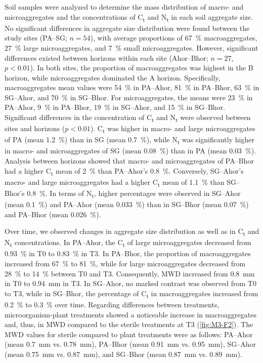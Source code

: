 Soil samples were analyzed to determine the mass distribution of macro- and microaggregates and the concentrations of C\textsubscript{t} and N\textsubscript{t} in each soil aggregate size. No significant differences in aggregate size distribution were found between the study sites (PA--SG; \(n = 54\)), with average proportions of \SI{67}{\percent} macroaggregates, \SI{27}{\percent} large microaggregates, and \SI{7}{\percent} small microaggregates. However, significant differences existed between horizons within each site (Ahor--Bhor; \(n = 27\), \(p < 0.01\)). In both sites, the proportion of macroaggregates was highest in the B horizon, while microaggregates dominated the A horizon. Specifically, macroaggregates mean values were \SI{54}{\percent} in PA--Ahor, \SI{81}{\percent} in PA--Bhor, \SI{63}{\percent} in SG--Ahor, and \SI{70}{\percent} in SG--Bhor. For microaggregates, the means were \SI{23}{\percent} in PA--Ahor, \SI{9}{\percent} in PA--Bhor, \SI{19}{\percent} in SG--Ahor, and \SI{15}{\percent} in SG--Bhor. Significant differences in the concentration of C\textsubscript{t} and N\textsubscript{t} were observed between sites and horizons (\(p < 0.01\)). C\textsubscript{t} was higher in macro- and large microaggregates of PA (mean \SI{1.2}{\percent}) than in SG (mean \SI{0.7}{\percent}), while N\textsubscript{t} was significantly higher in macro- and microaggregates of SG (mean \SI{0.08}{\percent}) than in PA (mean \SI{0.03}{\percent}). Analysis between horizons showed that macro- and microaggregates of PA--Bhor had a higher C\textsubscript{t} mean of \SI{2}{\percent} than PA--Ahor’s \SI{0.8}{\percent}. Conversely, SG--Ahor’s macro- and large microaggregates had a higher C\textsubscript{t} mean of \SI{1.1}{\percent} than SG--Bhor’s \SI{0.8}{\percent}. In terms of N\textsubscript{t}, higher percentages were observed in SG--Ahor (mean \SI{0.1}{\percent}) and PA--Ahor (mean \SI{0.033}{\percent}) than in SG--Bhor (mean \SI{0.07}{\percent}) and PA--Bhor (mean \SI{0.026}{\percent}).

Over time, we observed changes in aggregate size distribution as well as in C\textsubscript{t} and N\textsubscript{t} concentrations. In PA--Ahor, the C\textsubscript{t} of large microaggregates decreased from \SI{0.93}{\percent} in T0 to \SI{0.83}{\percent} in T3. In PA--Bhor, the proportion of macroaggregates increased from \SI{67}{\percent} to \SI{81}{\percent}, while for large microaggregates decreased from \SI{28}{\percent} to \SI{14}{\percent} between T0 and T3. Consequently, MWD increased from \SI{0.8}{\milli\metre} in T0 to \SI{0.94}{\milli\metre} in T3. In SG--Ahor, no marked contrast was observed from T0 to T3, while in SG--Bhor, the percentage of C\textsubscript{t} in macroaggregates increased from \SI{0.2}{\percent} to \SI{0.3}{\percent} over time. Regarding differences between treatments, microorganism-plant treatments showed a noticeable increase in macroaggregates and, thus, in MWD compared to the sterile treatments at T3 (\ref{fig:M3-F2}). The MWD values for sterile compared to plant treatments were as follows: PA--Ahor (mean \SI{0.7}{mm} vs. \SI{0.78}{\milli\metre}), PA--Bhor (mean \SI{0.91}{mm} vs. \SI{0.95}{\milli\metre}), SG--Ahor (mean \SI{0.75}{mm} vs. \SI{0.87}{\milli\metre}), and SG--Bhor (mean \SI{0.87}{mm} vs. \SI{0.89}{\milli\metre}).

